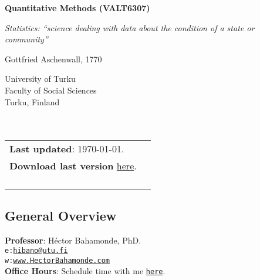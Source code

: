 \documentclass[letterpaper]{article}
\def\name{Quantitative Methods (VALT6307)}
\begin{document}

\centerline{\huge \bf \name}

\epigraph{\emph{Statistics: ``science dealing with data about the condition of a state or community''}}{Gottfried Aschenwall, 1770}


\vspace{0.25in}

\begin{minipage}{0.45\linewidth}
 University of Turku \\
  Faculty of Social Sciences \\
  Turku, Finland\\
  \\
  \\

\end{minipage}
\hspace{4cm}\begin{minipage}{0.45\linewidth}
  \begin{tabular}{ll}
{\bf Last updated}: \today. \\
 {\bf Download last version} \href{https://github.com/hbahamonde/OLS/raw/master/Bahamonde_OLS.pdf}{here}.%
    \\
    \\
    \\
    \\
    \\
  \end{tabular}
\end{minipage}

\subsection*{General Overview}


\vspace{1mm}
{\bf Professor}: H\'ector Bahamonde, PhD.\\
\texttt{e:}\href{mailto:hibano@utu.fi}{\texttt{hibano@utu.fi}}\\
\texttt{w:}\href{http://www.hectorbahamonde.com}{\texttt{www.HectorBahamonde.com}}\\
{\bf Office Hours}: Schedule time with me \href{https://calendly.com/bahamonde}{\texttt{here}}.\\
\end{document}
